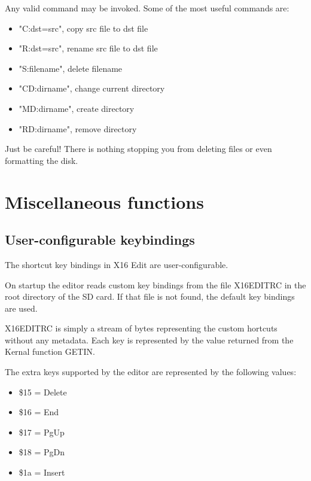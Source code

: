 \documentclass{article}
\begin{document}
        Any valid command may be invoked. Some of the most useful commands are:

     \begin{itemize} 
            \item "C:dst=src", copy src file to dst file
            \item "R:dst=src", rename src file to dst file
            \item "S:filename", delete filename
            \item "CD:dirname", change current directory
            \item "MD:dirname", create directory
            \item "RD:dirname", remove directory
    \end{itemize}
    
        Just be careful! There is nothing stopping you from deleting files or even formatting the
        disk.

\section{Miscellaneous functions}

    \subsection{User-configurable keybindings}
        The shortcut key bindings in X16 Edit are user-configurable.

        On startup the editor reads custom key bindings from the file X16EDITRC in the root directory
        of the SD card. If that file is not found, the default key bindings are
        used.
        
        X16EDITRC is simply a stream of bytes representing the custom hortcuts without any metadata. 
        Each key is represented by the value returned from the Kernal function GETIN.
        
        The extra keys supported by the editor are represented by the following values:
        
        \begin{itemize}
            \item \$15 = Delete
            \item \$16 = End
            \item \$17 = PgUp
            \item \$18 = PgDn
            \item \$1a = Insert 
        \end{itemize}
        
\end{document}
